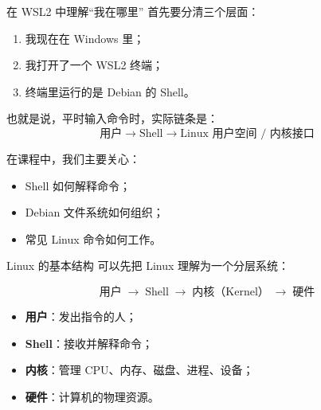 \documentclass[aspectratio=169]{beamer}
\begin{document}
\begin{frame}{在 WSL2 中理解“我在哪里”}
首先要分清三个层面：
\begin{enumerate}
  \item 我现在在 \alert{Windows} 里；
  \item 我打开了一个 \alert{WSL2 终端}；
  \item 终端里运行的是 \alert{Debian 的 Shell}。
\end{enumerate}

\vspace{0.5em}
也就是说，平时输入命令时，实际链条是：
\[
\text{用户} \longrightarrow \text{Shell} \longrightarrow \text{Linux 用户空间 / 内核接口}
\]

\vspace{0.5em}
在课程中，我们主要关心：
\begin{itemize}
  \item Shell 如何解释命令；
  \item Debian 文件系统如何组织；
  \item 常见 Linux 命令如何工作。
\end{itemize}
\end{frame}

\begin{frame}{Linux 的基本结构}
可以先把 Linux 理解为一个分层系统：

\vspace{0.5em}
\[
\text{用户} \;\longrightarrow\; \text{Shell} \;\longrightarrow\; \text{内核（Kernel）} \;\longrightarrow\; \text{硬件}
\]

\vspace{0.8em}
\begin{itemize}
  \item \textbf{用户}：发出指令的人；
  \item \textbf{Shell}：接收并解释命令；
  \item \textbf{内核}：管理 CPU、内存、磁盘、进程、设备；
  \item \textbf{硬件}：计算机的物理资源。
\end{itemize}
\end{frame}
\end{document}
